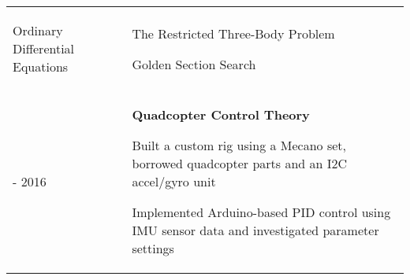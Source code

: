 \documentclass[letterpaper, 10pt]{article}
\begin{document}
\begin{tabularx}{\linewidth}{>{\raggedleft}p{2.2cm}|X X}
\begin{compact}
\item Ordinary Differential Equations
\vspace{-.5\baselineskip}
\end{compact}&
\begin{compact}
\vspace{-.5\baselineskip}
\item The Restricted Three-Body Problem
\item Golden Section Search%
\vspace{-.5\baselineskip}
\end{compact}\\
2015 - 2016 & \multicolumn{2}{p{\linegoal}}{
	\vspace{-2.9mm}\textbf{Quadcopter Control Theory}
	\begin{compact}
	\item Built a custom rig using a Mecano set, borrowed quadcopter parts and an I2C accel/gyro unit
	\item Implemented Arduino-based PID control using IMU sensor data and investigated parameter settings
	\vspace{-2\baselineskip}
	\end{compact}
}\\
\end{tabularx}

\end{document}
